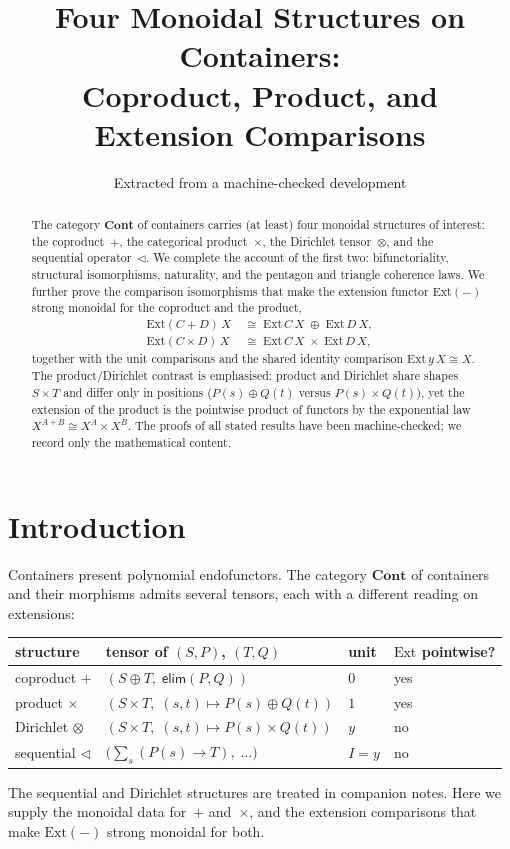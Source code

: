 \documentclass[11pt,a4paper]{article}
\title{Four Monoidal Structures on Containers:\\
  Coproduct, Product, and Extension Comparisons}
\author{Extracted from a machine-checked development}
\date{}
\theoremstyle{plain}
\theoremstyle{definition}
\newcommand{\Cont}{\mathbf{Cont}}
\newcommand{\Ext}{\mathrm{Ext}}
\newcommand{\seq}{\mathbin{\triangleleft}}
\begin{document}
\maketitle

\begin{abstract}
The category $\Cont$ of containers carries (at least) four monoidal
structures of interest: the coproduct~$+$, the categorical product~$\times$,
the Dirichlet tensor~$\otimes$, and the sequential operator~$\seq$. We
complete the account of the first two: bifunctoriality, structural
isomorphisms, naturality, and the pentagon and triangle coherence laws.
We further prove the comparison isomorphisms that make the extension
functor $\Ext(-)$ strong monoidal for the coproduct and the product,
\begin{align*}
  \Ext(C+D)\,X &\;\cong\; \Ext\,C\,X \;\oplus\; \Ext\,D\,X, \\
  \Ext(C \times D)\,X &\;\cong\; \Ext\,C\,X \;\times\; \Ext\,D\,X,
\end{align*}
together with the unit comparisons and the shared identity comparison
$\Ext\,y\,X \cong X$. The product/Dirichlet contrast is emphasised:
product and Dirichlet share shapes $S \times T$ and differ only in
positions ($P(s)\oplus Q(t)$ versus $P(s)\times Q(t)$), yet the extension
of the product is the pointwise product of functors by the exponential
law $X^{A+B} \cong X^A \times X^B$. The proofs of all stated results have
been machine-checked; we record only the mathematical content.
\end{abstract}

\tableofcontents
\bigskip

\section{Introduction}

Containers present polynomial endofunctors. The category $\Cont$ of
containers and their morphisms admits several tensors, each with a
different reading on extensions:
\begin{center}
\begin{tabular}{llll}
structure & tensor of $(S,P)$, $(T,Q)$ & unit & $\Ext$ pointwise? \\
\hline
coproduct $+$ & $(S \oplus T,\; \mathsf{elim}(P,Q))$ & $0$ & yes \\
product $\times$ & $(S \times T,\; (s,t) \mapsto P(s)\oplus Q(t))$ & $1$ & yes \\
Dirichlet $\otimes$ & $(S \times T,\; (s,t) \mapsto P(s)\times Q(t))$ & $y$ & no \\
sequential $\seq$ &
  $\bigl(\sum_s (P(s)\to T),\; \ldots\bigr)$ & $I{=}y$ & no
\end{tabular}
\end{center}
The sequential and Dirichlet structures are treated in companion notes.
Here we supply the monoidal data for~$+$ and~$\times$, and the extension
comparisons that make $\Ext(-)$ strong monoidal for both.
\end{document}
